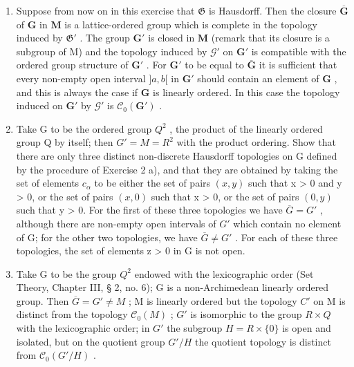 \begin{enumerate}
\def\labelenumi{\alph{enumi})}
\setcounter{enumi}{1}
\item
  Suppose from now on in this exercise that \(\mathfrak{G}\) is Hausdorff. Then the closure \(\overline{\mathbf{G}}\) of \(\mathbf{G}\) in \(\mathbf{M}\) is a lattice-ordered group which is complete in the topology induced by \(\mathfrak{G}'\) . The group \(\mathbf{G}'\) is closed in \(\mathbf{M}\) (remark that its closure is a subgroup of M) and the topology induced by \(\mathcal{G}'\) on \(\mathbf{G}'\) is compatible with the ordered group structure of \(\mathbf{G}'\) . For \(\mathbf{G}'\) to be equal to \(\overline{\mathbf{G}}\) it is sufficient that every non-empty open interval \(]a, b[\) in \(\mathbf{G}'\) should contain an element of \(\mathbf{G}\) , and this is always the case if \(\mathbf{G}\) is linearly ordered. In this case the topology induced on \(\mathbf{G}'\) by \(\mathcal{G}'\) is \(\mathcal{C}_0(\mathbf{G}')\) .
\item
  Take G to be the ordered group \(Q^{2}\) , the product of the linearly ordered group Q by itself; then \(G' = M = R^{2}\) with the product ordering. Show that there are only three distinct non-discrete Hausdorff topologies on G defined by the procedure of Exercise 2 a), and that they are obtained by taking the set of elements \(c_{\alpha}\) to be either the set of pairs \((x, y)\) such that x \textgreater{} 0 and y \textgreater{} 0, or the set of pairs \((x, 0)\) such that x \textgreater{} 0, or the set of pairs \((0, y)\) such that y \textgreater{} 0. For the first of these three topologies we have \(\overline{G} = G'\) , although there are non-empty open intervals of \(G'\) which contain no element of G; for the other two topologies, we have \(\overline{G} \neq G'\) . For each of these three topologies, the set of elements z \textgreater{} 0 in G is not open.
\item
  Take G to be the group \(Q^{2}\) endowed with the lexicographic order (Set Theory, Chapter III, § 2, no. 6); G is a non-Archimedean linearly ordered group. Then \(\overline{G}=G'\neq M\) ; M is linearly ordered but the topology \(C'\) on M is distinct from the topology \(\mathcal{C}_{0}(M)\) ; \(G'\) is isomorphic to the group \(R\times Q\) with the lexicographic order; in \(G'\) the subgroup \(H=R\times\{0\}\) is open and isolated, but on the quotient group \(G'/H\) the quotient topology is distinct from \(\mathcal{C}_{0}(G'/H)\) .
\end{enumerate}

